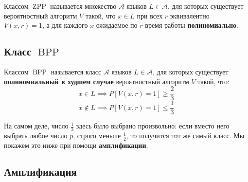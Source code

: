 \documentclass[11pt]{article}
\DeclareMathOperator{\BPP}{BPP}
\DeclareMathOperator{\ZPP}{ZPP}
\begin{document}
\begin{definition}
    Классом $\ZPP$ называется множество $\mathcal{A}$ языков $L \in \mathcal{A}$, для которых существует вероятностный алгоритм $V$ такой, что $x \in L$ при всех $r$ эквивалентно $V(x, r) = 1$, а для каждого $x$ ожидаемое по $r$ время работы \textbf{полиномиально}.
\end{definition}

\subsection{Класс $\BPP$}

\begin{definition}
    Классом $\BPP$ называется класс $\mathcal{A}$ языков $L \in \mathcal{A}$, для которых существует \textbf{полиномиальный в худшем случае} вероятностный алгоритм $V$ такой, что:
    \[x \in L \implies P[V(x, r) = 1] \geq \frac{2}{3}\]
    \[x \not \in L \implies P[V(x, r) = 1] \leq \frac{1}{3}\]
\end{definition}

\begin{remark}
    На самом деле, число $\frac{1}{3}$ здесь было выбрано произвольно: если вместо него выбрать любое число $p$, строго меньше $\frac{1}{2}$, то получится тот же самый класс. Мы покажем это ниже при помощи \textbf{амплификации}.
\end{remark}

\subsection{Амплификация}
\end{document}

